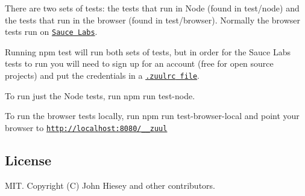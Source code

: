 There are two sets of tests\+: the tests that run in Node (found in {\ttfamily test/node}) and the tests that run in the browser (found in {\ttfamily test/browser}). Normally the browser tests run on \href{http://saucelabs.com/}{\tt Sauce Labs}.

Running {\ttfamily npm test} will run both sets of tests, but in order for the Sauce Labs tests to run you will need to sign up for an account (free for open source projects) and put the credentials in a \href{https://github.com/defunctzombie/zuul/wiki/zuulrc}{\tt {\ttfamily .zuulrc} file}.

To run just the Node tests, run {\ttfamily npm run test-\/node}.

To run the browser tests locally, run {\ttfamily npm run test-\/browser-\/local} and point your browser to {\ttfamily \href{http://localhost:8080/__zuul}{\tt http\+://localhost\+:8080/\+\_\+\+\_\+zuul}}

\subsection*{License}

M\+IT. Copyright (C) John Hiesey and other contributors. 